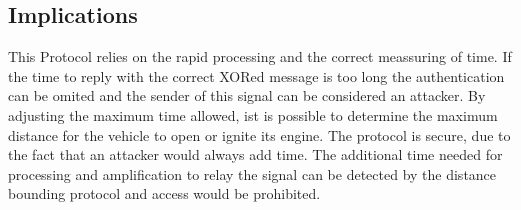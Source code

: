 \subsection{Implications}
	\label{sec:DBimp}
	This Protocol relies on the rapid processing and the correct meassuring of time.
	If the time to reply with the correct XORed message is too long the authentication
	can be omited and the sender of this signal can be considered an attacker.
	By adjusting the maximum time allowed,
	ist is possible to determine the maximum distance for the vehicle to open
	or ignite its engine.
	The protocol is secure,
	due to the fact that an attacker would always add time.
	The additional time needed for processing and amplification 
	to relay the signal can be detected by the distance bounding protocol
	and access would be prohibited.
	
	
	
